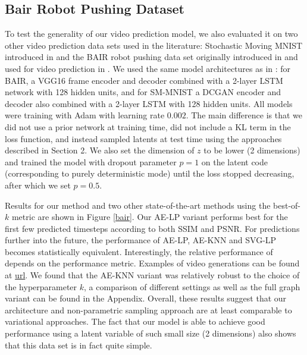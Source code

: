 \documentclass{article}
\begin{document}
\subsection{Bair Robot Pushing Dataset}

To test the generality of our video prediction model, we also evaluated it on two other video prediction data sets used in the literature: Stochastic Moving MNIST introduced in \citep{Denton2018} and the BAIR robot pushing data set originally introduced in \citep{Ebert17} and used for video prediction in \citep{Babaeizadeh2018, Denton2018}.
We used the same model architectures as in \citep{Denton2018}: for BAIR, a VGG16 frame encoder and decoder combined with a 2-layer LSTM network with 128 hidden units, and for SM-MNIST a DCGAN encoder and decoder also combined with a 2-layer LSTM with 128 hidden units. All models were training with Adam \citep{ADAM} with learning rate $0.002$.
The main difference is that we did not use a prior network at training time, did not include a KL term in the loss function, and instead sampled latents at test time using the approaches described in Section 2.
We also set the dimension of $z$ to be lower (2 dimensions) and trained the model with dropout parameter $p=1$ on the latent code (corresponding to purely deterministic mode) until the loss stopped decreasing, after which we set $p=0.5$.

Results for our method and two other state-of-the-art methods using the best-of-$k$ metric are shown in Figure \ref{bair}. Our AE-LP variant performs best for the first few predicted timesteps according to both SSIM and PSNR. For predictions further into the future, the performance of AE-LP, AE-KNN and SVG-LP becomes statistically equivalent.  Interestingly, the relative performance of \citep{Babaeizadeh2018} depends on the performance metric. Examples of video generations can be found at \url{url}. We found that the AE-KNN variant was relatively robust to the choice of the hyperparameter $k$, a comparison of different settings as well as the full graph variant can be found in the Appendix. Overall, these results suggest that our architecture and non-parametric sampling approach are at least comparable to variational approaches. The fact that our model is able to achieve good performance using a latent variable of such small size (2 dimensions) also shows that this data set is in fact quite simple.
\end{document}
